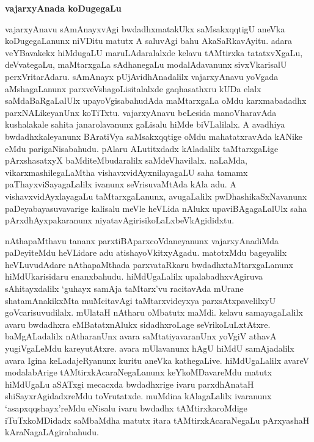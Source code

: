 \begin{center}
{\Large\bf vajarxyAnada koDugegaLu}
\end{center}

vajarxyAnavu sAmAnayxvAgi bwdadhxmatakUkx saMsakxqqtigU aneVka koDuge\-gaLanunx niVDitu matutx A saluvAgi bahu AkaSaRkavAyitu. adara veYBavakekx hiMdugaLU maruLAdaralalxde kelavu tAMtirxka tatatxvXgaLu, deVvategaLu, maMtarxgaLa sAdhanegaLu modalA\-davanunx sivxVkarisalU perxVritarAdaru. sAmAnayx pUjAvidhAnadalilx vajarx\-yAnavu yoVgada aMshagaLanunx parxveVshagoLisitalalxde gaqhasathxru kUDa elalx saMdaBaR\-gaLalUlx upa\-yoVgisabahudAda maMtarxgaLa oMdu karxmabadadhx parxNALikeyanUnx koTiTxtu. vajarx\-yAnavu beLesida manoVharavAda kushalakale sahita janarolavanunx gaLisalu hiMde biVLalilalx. A avadhiya bwdadhxkaleyanunx BAratiVya saMsakxqqtige oMdu mahatatxravAda kANike eMdu parigaNisabahudu. pAlaru ALutitxdadx kAladalilx taMtarxgaLige pArxshasatxyX baMditeMbudaralilx saMdeVhavilalx. naLaMda, vikarxmashilegaLaMtha vishavxvidAyxnilayagaLU saha tamamx paThayxviSayagaLalilx ivanunx seVrisuvaMtAda kAla adu. A vishavxvidAyxlayagaLu taMtarxgaLanunx, avugaLalilx pwDhashikaSxNavanunx paDeya\-bayasuvavarige kalisalu meVle heVLida nAlukx upaviBAgagaLalUlx saha pArxdhAyxpakaranunx niyatavAgirisikoLaLxbeVkAgi\-didxtu.

nAthapaMthavu tananx parxtiBAparxcoVdaneyanunx vajarxyAnadiMda paDeyiteMdu heVLi\-dare adu atishayoVkitxyAgadu. matotxMdu bageyalilx heVLuvudAdare nAthapaMthada parxvataRkaru bwdadhxtaMtarxgaLanunx hiMdUkarisidaru enanxbahudu. hiMdUgaLalilx upalabadhxvAgiruva sAhitayxdalilx `guhayx samAja taMtarx'vu racitavAda mUrane shatamAnakikxMta muMcitavAgi taMtarxvideyxya parxsAtxpavelilxyU goVcarisuvudilalx. mUlataH nAtharu oMbatutx maMdi. kelavu samayagaLalilx avaru bwdadhxra eMBatatxnAlukx sidadhxroLage seVrikoLuLxtAtxre. baMgALadalilx nAtharanUnx avara saMtatiyavaranUnx yoVgiV athavA yugiVgaLeMdu kareyutAtxre. avara mUlavanunx hAgU hiMdU samAjadalilx avara Igina keLadajeRyanunx kuritu aneVka kathegaLive. hiMdUgaLalilx avareV modalabArige tAMtirxkAcaraNegaLanunx keYkoMDavareMdu matutx hiMdUgaLu aSATxgi mecacxda bwdadhxrige ivaru parxdhAnataH shiSayxrAgidadxreMdu toVrutatxde. muMdina kAlagaLalilx ivaranunx `asapxqqshayx'reMdu eNisalu ivaru bwdadhx tAMtirxkaroMdige iTuTxkoMDidadx saMbaMdha matutx itara tAMtirxkAcaraNegaLu pArxyashaH kAraNagaLAgirabahudu.

